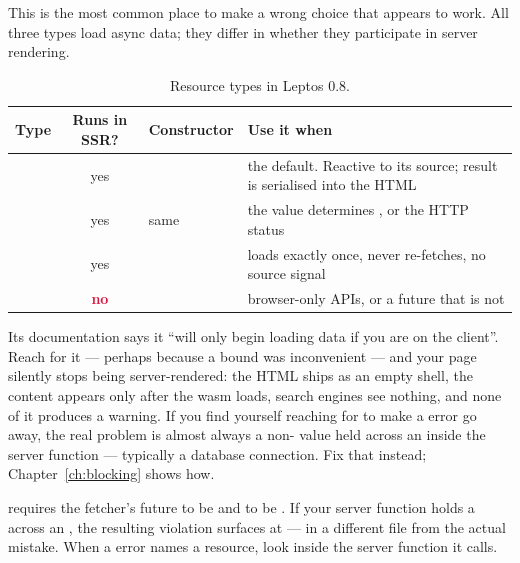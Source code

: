 This is the most common place to make a wrong choice that appears to work. All three types load
async data; they differ in whether they participate in server rendering.

\begin{table}[htbp]
\centering
\caption{Resource types in Leptos 0.8.}
\label{tab:resources}
\small
\begin{tabular}{@{}L{0.19\textwidth}cL{0.30\textwidth}L{0.34\textwidth}@{}}
\toprule
\textbf{Type} & \textbf{Runs in SSR?} & \textbf{Constructor} & \textbf{Use it when} \\
\midrule
{} & \textcolor{moss}{yes} &  & the default. Reactive to
its source; result is serialised into the HTML \\
 & \textcolor{moss}{yes} & same & the value determines
,  or the HTTP status \\
 & \textcolor{moss}{yes} &  & loads exactly once, never
re-fetches, no source signal \\
 & \textcolor{crimson}{\textbf{no}} &  & browser-only APIs,
or a future that is not  \\
\bottomrule
\end{tabular}
\end{table}

\begin{pitfall}
Its documentation says it ``will only begin loading data if you are on the client''. Reach for it
--- perhaps because a  bound was inconvenient --- and your page silently stops being
server-rendered: the HTML ships as an empty shell, the content appears only after the wasm loads,
search engines see nothing, and none of it produces a warning. If you find yourself reaching for
 to make a  error go away, the real problem is almost always a
non- value held across an  inside the server function --- typically a
database connection. Fix that instead; Chapter~\ref{ch:blocking} shows how.
\end{pitfall}

\begin{pitfall}
 requires the fetcher's future to be  and  to be
. If your server function holds a
 across an , the resulting  violation surfaces at
 --- in a different file from the actual mistake. When a  error names
a resource, look inside the server function it calls.
\end{pitfall}

